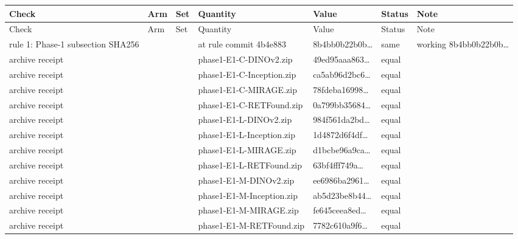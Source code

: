 \begin{longtable}{@{}p{3.3cm}lp{1.5cm}p{3.6cm}p{2.2cm}p{1.6cm}p{3.2cm}@{}}
\toprule
Check & Arm & Set & Quantity & Value & Status & Note \\
\midrule
\endfirsthead
\toprule
Check & Arm & Set & Quantity & Value & Status & Note \\
\midrule
\endhead
\bottomrule
\endfoot
\bottomrule
\endlastfoot
rule 1: Phase-1 subsection SHA256 &  &  & at rule commit 4b4e883 & 8b4bb0b22b0b\ldots{} & same & working 8b4bb0b22b0b\ldots{} \\
archive receipt &  &  & phase1-E1-C-DINOv2.zip & 49ed95aaa863\ldots{} & equal &  \\
archive receipt &  &  & phase1-E1-C-Inception.zip & ca5ab96d2bc6\ldots{} & equal &  \\
archive receipt &  &  & phase1-E1-C-MIRAGE.zip & 78fdeba16998\ldots{} & equal &  \\
archive receipt &  &  & phase1-E1-C-RETFound.zip & 0a799bb35684\ldots{} & equal &  \\
archive receipt &  &  & phase1-E1-L-DINOv2.zip & 984f561da2bd\ldots{} & equal &  \\
archive receipt &  &  & phase1-E1-L-Inception.zip & 1d4872d6f4df\ldots{} & equal &  \\
archive receipt &  &  & phase1-E1-L-MIRAGE.zip & d1bcbe96a9ca\ldots{} & equal &  \\
archive receipt &  &  & phase1-E1-L-RETFound.zip & 63bf4fff749a\ldots{} & equal &  \\
archive receipt &  &  & phase1-E1-M-DINOv2.zip & ee6986ba2961\ldots{} & equal &  \\
archive receipt &  &  & phase1-E1-M-Inception.zip & ab5d23be8b44\ldots{} & equal &  \\
archive receipt &  &  & phase1-E1-M-MIRAGE.zip & fe645ceea8ed\ldots{} & equal &  \\
archive receipt &  &  & phase1-E1-M-RETFound.zip & 7782c610a9f6\ldots{} & equal &  \\

\end{longtable}
